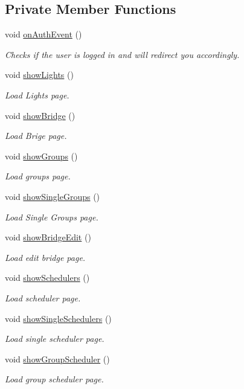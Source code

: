 \subsection*{Private Member Functions}
\begin{DoxyCompactItemize}
\item 
void \hyperlink{classHueApp_af349923ea5d293c0226efd3ef71f4616}{on\+Auth\+Event} ()
\begin{DoxyCompactList}\small\item\em Checks if the user is logged in and will redirect you accordingly. \end{DoxyCompactList}\item 
void \hyperlink{classHueApp_a3f5ea7541b2a416acd0b9f4e94073e72}{show\+Lights} ()
\begin{DoxyCompactList}\small\item\em Load Lights page. \end{DoxyCompactList}\item 
void \hyperlink{classHueApp_a9e30cb9f84bfdc63261c6273cf07d5b1}{show\+Bridge} ()
\begin{DoxyCompactList}\small\item\em Load Brige page. \end{DoxyCompactList}\item 
void \hyperlink{classHueApp_a05c48b318d651f27237ab6fc3c66c33b}{show\+Groups} ()
\begin{DoxyCompactList}\small\item\em Load groups page. \end{DoxyCompactList}\item 
void \hyperlink{classHueApp_a096902db63e23b1efb5756010af69209}{show\+Single\+Groups} ()
\begin{DoxyCompactList}\small\item\em Load Single Groups page. \end{DoxyCompactList}\item 
void \hyperlink{classHueApp_ac7c5d1873645cd951ced6bf5216bfbc6}{show\+Bridge\+Edit} ()
\begin{DoxyCompactList}\small\item\em Load edit bridge page. \end{DoxyCompactList}\item 
void \hyperlink{classHueApp_a889374816e88dddf42d7dc44732dbc3a}{show\+Schedulers} ()
\begin{DoxyCompactList}\small\item\em Load scheduler page. \end{DoxyCompactList}\item 
void \hyperlink{classHueApp_ac5a4d1846976aca6318ab3cda3f6959e}{show\+Single\+Schedulers} ()
\begin{DoxyCompactList}\small\item\em Load single scheduler page. \end{DoxyCompactList}\item 
void \hyperlink{classHueApp_a45eff8d6e5be7df68c49673a725f1d85}{show\+Group\+Scheduler} ()
\begin{DoxyCompactList}\small\item\em Load group scheduler page. \end{DoxyCompactList}\end{DoxyCompactItemize}
